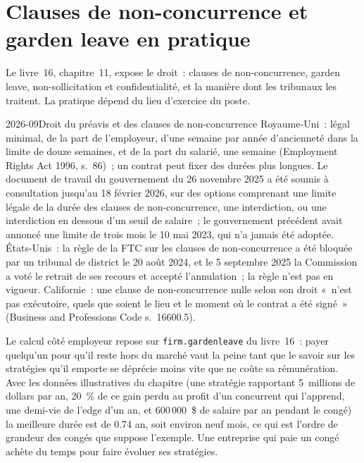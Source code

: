 \section{Clauses de non-concurrence et garden leave en pratique}

Le livre~16, chapitre~11, expose le droit~: clauses de non-concurrence, garden leave, non-sollicitation et confidentialité, et la manière
dont les tribunaux les traitent. La pratique dépend du lieu d'exercice du poste.

\begin{dated}{2026-09}{Droit du préavis et des clauses de non-concurrence}\label{dat:in:career-paths-and-moves:law}
Royaume-Uni~:  légal minimal, de la part de l'employeur, d'une semaine par année d'ancienneté dans la limite de douze semaines, et de la part
du salarié, une semaine (Employment Rights Act 1996, s.~86)~; un contrat peut fixer des durées plus longues. Le document de travail
du gouvernement du 26 novembre 2025 a été soumis à consultation jusqu'au 18 février 2026, sur des options comprenant une limite légale de la durée
des clauses de non-concurrence, une interdiction, ou une interdiction en dessous d'un seuil de salaire~; le gouvernement précédent avait annoncé une limite de trois mois
le 10 mai 2023, qui n'a jamais été adoptée. États-Unis~: la règle de la FTC sur les clauses de non-concurrence a été bloquée par un tribunal de district le
20 août 2024, et le 5 septembre 2025 la Commission a voté le retrait de ses recours et accepté l'annulation~; la
règle n'est pas en vigueur. Californie~: une clause de non-concurrence nulle selon son droit «~n'est pas exécutoire, quels que soient le lieu et le moment où le
contrat a été signé~» (Business and Professions Code s.~16600.5).
\end{dated}

Le calcul côté employeur repose sur \texttt{firm.gardenleave} du livre~16~: payer quelqu'un pour qu'il reste hors du marché
vaut la peine tant que le savoir sur les stratégies qu'il emporte se déprécie moins vite que ne coûte sa rémunération. Avec les données illustratives du chapitre
(une stratégie rapportant 5~millions de dollars par an, 20~\% de ce gain perdu au profit d'un concurrent qui l'apprend, une demi-vie de l'edge d'un an, et 600\,000~\$ de salaire par an pendant le congé)
la meilleure durée est de 0.74 an, soit environ neuf mois, ce qui est l'ordre de grandeur
des congés que suppose l'exemple. Une entreprise qui paie un congé achète du temps pour faire évoluer ses stratégies.

